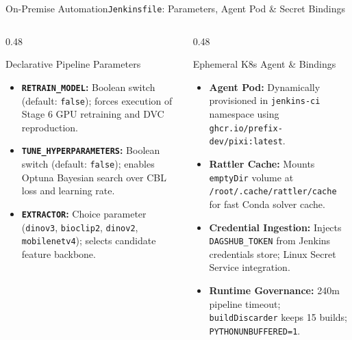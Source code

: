 \begin{frame}{On-Premise Automation}{\texttt{Jenkinsfile}: Parameters, Agent Pod \& Secret Bindings}
    \begin{columns}[T]
        \begin{column}{0.48\textwidth}
            \begin{block}{Declarative Pipeline Parameters}
                \begin{itemize}\footnotesize
                    \item \textbf{\texttt{RETRAIN\_MODEL}:} Boolean switch (default: \texttt{false}); forces execution of Stage 6 GPU retraining and DVC reproduction.
                    \item \textbf{\texttt{TUNE\_HYPERPARAMETERS}:} Boolean switch (default: \texttt{false}); enables Optuna Bayesian search over CBL loss and learning rate.
                    \item \textbf{\texttt{EXTRACTOR}:} Choice parameter (\texttt{dinov3}, \texttt{bioclip2}, \texttt{dinov2}, \texttt{mobilenetv4}); selects candidate feature backbone.
                \end{itemize}
            \end{block}
        \end{column}
        \begin{column}{0.48\textwidth}
            \begin{block}{Ephemeral K8s Agent \& Bindings}
                \begin{itemize}\footnotesize
                    \item \textbf{Agent Pod:} Dynamically provisioned in \texttt{jenkins-ci} namespace using \texttt{ghcr.io/prefix-dev/pixi:latest}.
                    \item \textbf{Rattler Cache:} Mounts \texttt{emptyDir} volume at \texttt{/root/.cache/rattler/cache} for fast Conda solver cache.
                    \item \textbf{Credential Ingestion:} Injects \texttt{DAGSHUB\_TOKEN} from Jenkins credentials store; Linux Secret Service integration.
                    \item \textbf{Runtime Governance:} 240m pipeline timeout; \texttt{buildDiscarder} keeps 15 builds; \texttt{PYTHONUNBUFFERED=1}.
                \end{itemize}
            \end{block}
        \end{column}
    \end{columns}


\end{frame}
